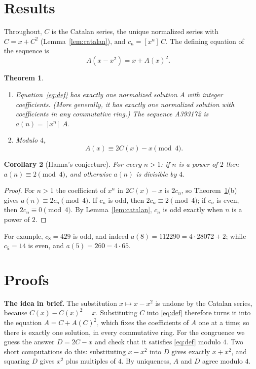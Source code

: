\documentclass[11pt,a4paper]{article}
\newtheorem{theorem}{Theorem}[section]
\newtheorem{corollary}[theorem]{Corollary}
\theoremstyle{definition}
\theoremstyle{remark}
\newcommand{\coeff}[2]{[x^{#1}]\,#2}
\newcommand{\para}[1]{\par\medskip\noindent\textbf{#1}\enspace}
\begin{document}
\section{Results}\label{sec:results}

Throughout, $C$ is the Catalan series, the unique normalized series with $C=x+C^2$ (Lemma~\ref{lem:catalan}), and
$c_n=\coeff{n}{C}$. The defining equation of the sequence is
\begin{equation}\label{eq:def}
A(x-x^2)=x+A(x)^2 .
\end{equation}

\begin{theorem}\label{thm:main}
\begin{enumerate}[label=(\alph*)]
\item Equation~\eqref{eq:def} has exactly one normalized solution $A$ with integer coefficients. (More generally, it
has exactly one normalized solution with coefficients in any commutative ring.) The sequence A393172 is
$a(n)=\coeff{n}{A}$.
\item Modulo $4$,
\[
A(x)\equiv 2C(x)-x\pmod 4 .
\]
\end{enumerate}
\end{theorem}

\begin{corollary}[Hanna's conjecture]\label{cor:conj}
For every $n>1$: if $n$ is a power of $2$ then $a(n)\equiv2\pmod4$, and otherwise $a(n)$ is divisible by $4$.
\end{corollary}

\begin{proof}
For $n>1$ the coefficient of $x^n$ in $2C(x)-x$ is $2c_n$, so Theorem~\ref{thm:main}(b) gives $a(n)\equiv2c_n\pmod4$.
If $c_n$ is odd, then $2c_n\equiv2\pmod4$; if $c_n$ is even, then $2c_n\equiv0\pmod4$. By Lemma~\ref{lem:catalan},
$c_n$ is odd exactly when $n$ is a power of $2$.
\end{proof}

For example, $c_8=429$ is odd, and indeed $a(8)=112290=4\cdot28072+2$; while $c_5=14$ is even, and $a(5)=260=4\cdot65$.

\section{Proofs}\label{sec:proofs}

\para{The idea in brief.} The substitution $x\mapsto x-x^2$ is undone by the Catalan series, because
$C(x)-C(x)^2=x$. Substituting $C$ into \eqref{eq:def} therefore turns it into the equation $A=C+A(C)^2$, which fixes
the coefficients of $A$ one at a time; so there is exactly one solution, in every commutative ring. For the congruence we
guess the answer $D=2C-x$ and check that it satisfies \eqref{eq:def} modulo $4$. Two short computations do this:
substituting $x-x^2$ into $D$ gives exactly $x+x^2$, and squaring $D$ gives $x^2$ plus multiples of $4$. By uniqueness,
$A$ and $D$ agree modulo $4$.
\end{document}
